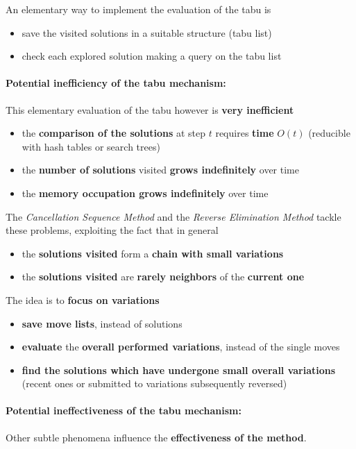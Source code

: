 An elementary way to implement the evaluation of the tabu is
\begin{itemize}
	\item save the visited solutions in a suitable structure (tabu list)
	\item check each explored solution making a query on the tabu list
\end{itemize}

\newpage

\paragraph{Potential inefficiency of the tabu mechanism:} This elementary evaluation of the tabu however is \textbf{very inefficient}
\begin{itemize}
	\item the \textbf{comparison of the solutions} at step $t$ requires \textbf{time} $O (t)$ (reducible with hash tables or search trees)
	\item the \textbf{number of solutions} visited \textbf{grows indefinitely} over time
	\item the \textbf{memory occupation grows indefinitely} over time
\end{itemize}

The \textit{Cancellation Sequence Method} and the \textit{Reverse Elimination Method} tackle these problems, exploiting the fact that in general
\begin{itemize}
	\item the \textbf{solutions visited} form a \textbf{chain with small variations}
	\item the \textbf{solutions visited} are \textbf{rarely neighbors} of the \textbf{current one}
\end{itemize}

The idea is to \textbf{focus on variations}
\begin{itemize}
	\item \textbf{save move lists}, instead of solutions
	\item \textbf{evaluate} the \textbf{overall performed variations}, instead of the single moves
	\item \textbf{find the solutions which have undergone small overall variations} (recent ones or submitted to variations subsequently reversed)
\end{itemize}

\vfill

\paragraph{Potential ineffectiveness of the tabu mechanism:} Other subtle phenomena influence the \textbf{effectiveness of the method}.\\

